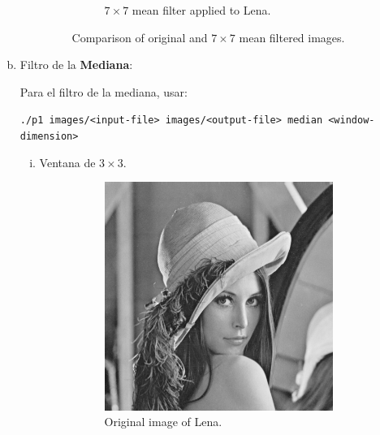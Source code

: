 \documentclass{article}
\theoremstyle{problemstyle}
\begin{document}
\begin{problem}
\begin{enumerate}[a)]
\begin{enumerate}[i)]
\begin{figure}[H]
\begin{subfigure}{.45\textwidth}
				            \caption{$ 7\times 7 $ mean filter applied to Lena.}
				            \label{fig:lena_mean_7x7}
			            \end{subfigure}
			            \caption{Comparison of original and $ 7\times 7 $ mean filtered images.}
		            \end{figure}
	      \end{enumerate}

	\item Filtro de la \textbf{Mediana}:

    Para el filtro de la mediana, usar:

    \texttt{./p1 images/<input-file> images/<output-file> median <window-dimension>}
	      \begin{enumerate}[i)]
		      \item Ventana de $ 3\times 3 $.
		            \begin{figure}[H]
			            \begin{subfigure}{.45\textwidth}
				            \centering
				            \includegraphics[width=0.95\textwidth]{lena_ascii.png}
				            \caption{Original image of Lena.}
			            \end{subfigure}
			            \hfill
			            \begin{subfigure}{.45\textwidth}
				            \centering

\end{subfigure}
\end{figure}
\end{enumerate}
\end{enumerate}
\end{problem}
\end{document}
